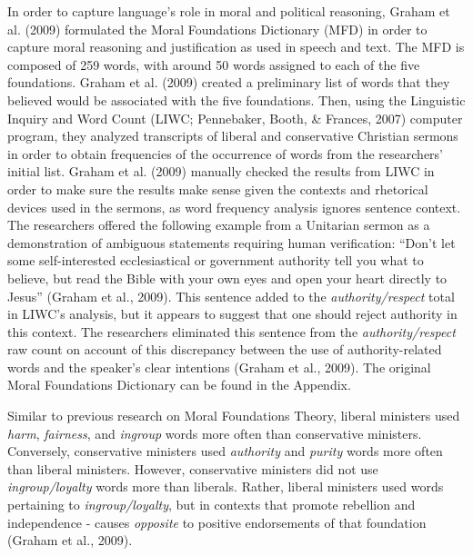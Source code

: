 \documentclass[english,,man]{apa6}
\begin{document}
In order to capture language's role in moral and political reasoning, Graham et al. (2009) formulated the Moral Foundations Dictionary (MFD) in order to capture moral reasoning and justification as used in speech and text. The MFD is composed of 259 words, with around 50 words assigned to each of the five foundations. Graham et al. (2009) created a preliminary list of words that they believed would be associated with the five foundations. Then, using the Linguistic Inquiry and Word Count (LIWC; Pennebaker, Booth, \& Frances, 2007) computer program, they analyzed transcripts of liberal and conservative Christian sermons in order to obtain frequencies of the occurrence of words from the researchers' initial list. Graham et al. (2009) manually checked the results from LIWC in order to make sure the results make sense given the contexts and rhetorical devices used in the sermons, as word frequency analysis ignores sentence context. The researchers offered the following example from a Unitarian sermon as a demonstration of ambiguous statements requiring human verification: \enquote{Don't let some self-interested ecclesiastical or government authority tell you what to believe, but read the Bible with your own eyes and open your heart directly to Jesus} (Graham et al., 2009). This sentence added to the \emph{authority/respect} total in LIWC's analysis, but it appears to suggest that one should reject authority in this context. The researchers eliminated this sentence from the \emph{authority/respect} raw count on account of this discrepancy between the use of authority-related words and the speaker's clear intentions (Graham et al., 2009). The original Moral Foundations Dictionary can be found in the Appendix.

Similar to previous research on Moral Foundations Theory, liberal ministers used \emph{harm}, \emph{fairness}, and \emph{ingroup} words more often than conservative ministers. Conversely, conservative ministers used \emph{authority} and \emph{purity} words more often than liberal ministers. However, conservative ministers did not use \emph{ingroup/loyalty} words more than liberals. Rather, liberal ministers used words pertaining to \emph{ingroup/loyalty}, but in contexts that promote rebellion and independence - causes \emph{opposite} to positive endorsements of that foundation (Graham et al., 2009).
\end{document}
